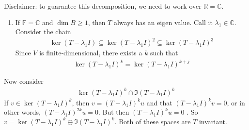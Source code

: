 \documentclass{article}
\begin{document}
Disclaimer: to guarantee this decomposition, we need to work over $\mathbb{R} = \mathbb{C}$. 
\begin{enumerate}
	\item If $\mathbb{F} = \mathbb{C}$ and $\dim{B} \geq 1$, then $T$ always has an eigen value. Call it $\lambda_{1} \in \mathbb{C}$. Consider the chain 
		\begin{align*}
			\ker{(T - \lambda_{1}I)} \subseteq \ker{(T - \lambda_{1}I)^{2}} \subseteq \ker{(T - \lambda_{1}I)^{3}}
		\end{align*}
		Since $V$ is finite-dimensional, there exists a $k$ such that 
		\begin{align*}
			\ker{(T - \lambda_{1}I)^{k}} = \ker{(T - \lambda_{1}I)^{k + j} }
		\end{align*}
\end{enumerate}
Now consider 
\begin{align*}
	\ker{(T - \lambda_{1}I)^{k}} \cap \Im{(T - \lambda_{1}I)^{k}}
\end{align*}
If $v \in \ker{(T - \lambda_{1}I)^{k}}$, then $v = (T - \lambda_{1}I)^{k}u$ and that $(T - \lambda_{1}I)^{k}v = 0$, or in other words, $(T - \lambda_{1}I)^{2k}u = 0$. But then $(T - \lambda_{1}I)^{k}u = 0$ .
So $v = \ker{(T - \lambda_{1}I)^{k}} \oplus \Im{(T - \lambda_{1}I)^{k}}$. Both of these spaces are $T$ invariant.
\end{document}
